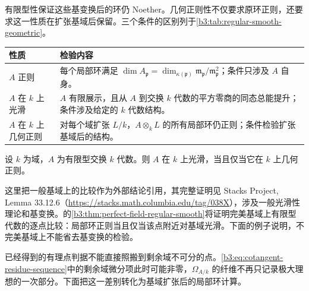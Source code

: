 有限型性保证这些基变换后的环仍 Noether。几何正则性不仅要求原环正则，还要求这一性质在扩张基域后保留。三个条件的区别列于\cref{b3:tab:regular-smooth-geometric}。

\begin{center}
	\begin{minipage}{\textwidth}
		\makeatletter
		\def\@captype{table}
		\makeatother
		\centering
		\caption[正则、光滑与几何正则]{正则、光滑与几何正则。设 \(k\) 为域，\(A\) 为有限型交换 \(k\) 代数；第一行的条件对每个 \(\mathfrak p\in\operatorname{Spec}A\) 检验，\(\mathfrak m_{\mathfrak p}=\mathfrak pA_{\mathfrak p}\)，\(\kappa(\mathfrak p)\) 为其剩余域。}
		\label{b3:tab:regular-smooth-geometric}
		\begin{tabularx}{\textwidth}{@{}>{\raggedright\arraybackslash}p{}>{\raggedright\arraybackslash}X@{}}
			\toprule
			性质 & 检验内容\\
			\midrule
			\(A\) 正则 & 每个局部环满足 \(\dim A_{\mathfrak p}=\dim_{\kappa(\mathfrak p)}\mathfrak m_{\mathfrak p}/\mathfrak m_{\mathfrak p}^2\)；条件只涉及 \(A\) 自身。\\
			\(A\) 在 \(k\) 上光滑 & \(A\) 有限展示，且从 \(A\) 到交换 \(k\) 代数的平方零商的同态总能提升；条件涉及给定的 \(k\) 代数结构。\\
			\(A\) 在 \(k\) 上几何正则 & 对每个域扩张 \(L/k\)，\(A\otimes_kL\) 的所有局部环仍正则；条件检验扩张基域后的结构。\\
			\bottomrule
		\end{tabularx}
	\end{minipage}
\end{center}

\begin{claim}[光滑性与几何正则性]\label{b3:claim:smooth-geometrically-regular}
	设 \(k\) 为域，\(A\) 为有限型交换 \(k\) 代数。则 \(A\) 在 \(k\) 上光滑，当且仅当它在 \(k\) 上几何正则。
\end{claim}
这里把一般基域上的比较作为外部结论引用，其完整证明见 Stacks Project, Lemma 33.12.6（\url{https://stacks.math.columbia.edu/tag/038X}），涉及一般光滑性理论和基变换。的\cref{b3:thm:perfect-field-regular-smooth}将证明完美基域上有限型代数的逐点比较：局部环正则当且仅当该点附近对基域光滑。下面的例子说明，不完美基域上不能省去基变换的检验。

\ProseParagraphBreak
已经得到的有理点判据不能直接照搬到剩余域不可分的点。\eqref{b3:eq:cotangent-residue-sequence}中的剩余域微分项此时可能非零，\(\Omega_{A/k}\) 的纤维不再只记录极大理想的一次部分。下面把这一差别转化为基域扩张后的局部环计算。

